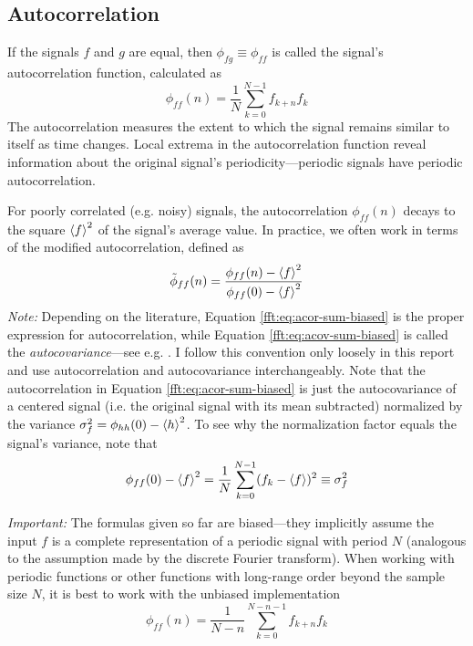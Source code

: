 \documentclass[11pt, a4paper]{article}
\begin{document}
\subsection{Autocorrelation}
If the signals $ f $ and $ g $ are equal, then $ \phi_{fg} \equiv \phi_{ff} $ is called the signal's autocorrelation function, calculated as
\begin{equation}
	\phi_{ff}(n) = \frac{1}{N}\sum_{k = 0}^{N-1}f_{k+n}f_{k} \label{fft:eq:acov-sum-biased}
\end{equation}
The autocorrelation measures the extent to which the signal remains similar to itself as time changes. Local extrema in the autocorrelation function reveal information about the original signal's periodicity---periodic signals have periodic autocorrelation.

For poorly correlated (e.g. noisy) signals, the autocorrelation $ \phi_{ff}(n) $ decays to the square $ \ev{f}^{2} $ of the signal's average value. In practice, we often work in terms of the modified autocorrelation, defined as
\begin{equation}
	\tilde{\phi}_{ff}(n) = \frac{\phi_{ff}(n) - \ev{f}^{2}}{\phi_{ff}(0) - \ev{f}^{2}}  \label{fft:eq:acor-sum-biased}
\end{equation}
\textit{Note:} Depending on the literature, Equation \ref{fft:eq:acor-sum-biased} is the proper expression for autocorrelation, while Equation \ref{fft:eq:acov-sum-biased} is called the \textit{autocovariance}---see e.g. \cite{wiki-cor-cov}. I follow this convention only loosely in this report and use autocorrelation and autocovariance interchangeably. Note that the autocorrelation in  Equation \ref{fft:eq:acor-sum-biased} is just the autocovariance of a centered signal (i.e. the original signal with its mean subtracted) normalized by the variance $ \sigma_{f}^{2} = \phi_{hh}(0) - \ev{h}^{2} $. To see why the normalization factor equals the signal's variance, note that
\begin{equation*}
	\phi_{ff}(0) - \ev{f}^{2} = \frac{1}{N}\sum_{k=0}^{N-1}(f_{k}-\ev{f})^{2} \equiv \sigma_{f}^{2}
\end{equation*}



\textit{Important:} The formulas given so far are biased---they implicitly assume the input $ f $ is a complete representation of a periodic signal with period $ N $ (analogous to the assumption made by the discrete Fourier transform). When working with periodic functions or other functions with long-range order beyond the sample size $ N $, it is best to work with the unbiased implementation
\begin{equation}
	\phi_{ff}(n) = \frac{1}{N-n}\sum_{k=0}^{N-n-1}f_{k+n}f_{k} \label{fft:eq:acov-sum-unbiased}
\end{equation}
\end{document}
